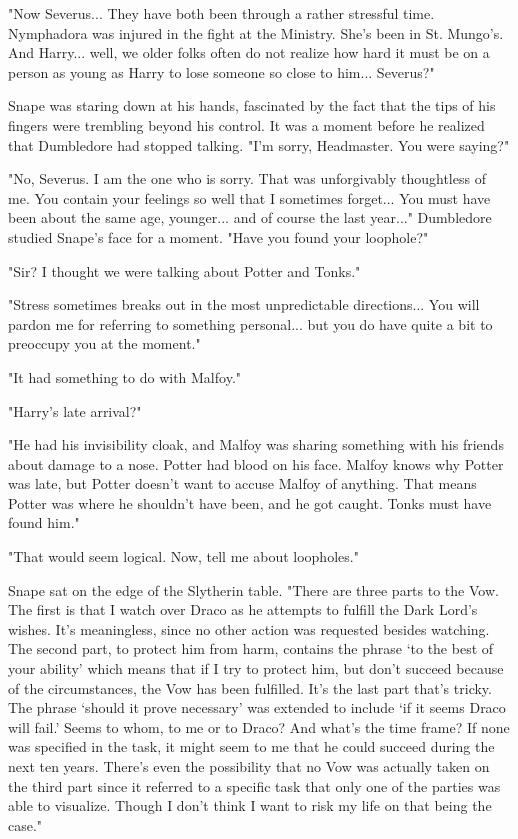 \documentclass[a4paper,11pt]{article}
\begin{document}
"Now Severus... They have both been through a rather stressful time. Nymphadora was injured in the fight at the Ministry. She's been in St. Mungo's. And Harry... well, we older folks often do not realize how hard it must be on a person as young as Harry to lose someone so close to him... Severus?"

Snape was staring down at his hands, fascinated by the fact that the tips of his fingers were trembling beyond his control. It was a moment before he realized that Dumbledore had stopped talking. "I'm sorry, Headmaster. You were saying?"

"No, Severus. I am the one who is sorry. That was unforgivably thoughtless of me. You contain your feelings so well that I sometimes forget... You must have been about the same age, younger... and of course the last year..." Dumbledore studied Snape's face for a moment. "Have you found your loophole?"

"Sir? I thought we were talking about Potter and Tonks."

"Stress sometimes breaks out in the most unpredictable directions... You will pardon me for referring to something personal... but you do have quite a bit to preoccupy you at the moment."

"It had something to do with Malfoy."

"Harry's late arrival?"

"He had his invisibility cloak, and Malfoy was sharing something with his friends about damage to a nose. Potter had blood on his face. Malfoy knows why Potter was late, but Potter doesn't want to accuse Malfoy of anything. That means Potter was where he shouldn't have been, and he got caught. Tonks must have found him."

"That would seem logical. Now, tell me about loopholes."

Snape sat on the edge of the Slytherin table. "There are three parts to the Vow. The first is that I watch over Draco as he attempts to fulfill the Dark Lord's wishes. It's meaningless, since no other action was requested besides watching. The second part, to protect him from harm, contains the phrase `to the best of your ability' which means that if I try to protect him, but don't succeed because of the circumstances, the Vow has been fulfilled. It's the last part that's tricky. The phrase `should it prove necessary' was extended to include `if it seems Draco will fail.' Seems to whom, to me or to Draco? And what's the time frame? If none was specified in the task, it might seem to me that he could succeed during the next ten years. There's even the possibility that no Vow was actually taken on the third part since it referred to a specific task that only one of the parties was able to visualize. Though I don't think I want to risk my life on that being the case."
\end{document}
